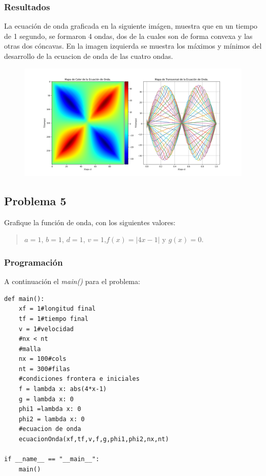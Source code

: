 \documentclass[a4paper,12pt]{article}
\newcommand{\eq}[1]{$#1$}
\begin{document}
    \subsubsection{Resultados}
    La ecuación de onda graficada en la siguiente imágen, muestra que en un tiempo de 1 segundo,
    se formaron 4 ondas, dos de la cuales son de forma convexa y las otras dos cóncavas.
    En la imagen izquierda se muestra los máximos y mínimos del desarrollo de la ecuacion de onda
    de las cuatro ondas.

    \begin{figure}[h]
        \centering
        \includegraphics[width=\textwidth]{graph4.png}
    \end{figure}

    \subsection{Problema 5}
    Grafique la función de onda, con los siguientes valores:
    \begin{quote}
        \centering
        \eq{a = 1}, \eq{b = 1}, \eq{d = 1}, \eq{v = 1},\eq{f(x) = |4x - 1|} y \eq{g(x) = 0}.
    \end{quote}
    \subsubsection{Programación}
    A continuación el \emph{main()} para el problema:

\begin{lstlisting}[frame=single]
def main():
    xf = 1#longitud final
    tf = 1#tiempo final
    v = 1#velocidad 
    #nx < nt
    #malla
    nx = 100#cols
    nt = 300#filas
    #condiciones frontera e iniciales
    f = lambda x: abs(4*x-1)
    g = lambda x: 0
    phi1 =lambda x: 0
    phi2 = lambda x: 0
    #ecuacion de onda
    ecuacionOnda(xf,tf,v,f,g,phi1,phi2,nx,nt)

if __name__ == "__main__":
    main()
\end{lstlisting}
\end{document}
